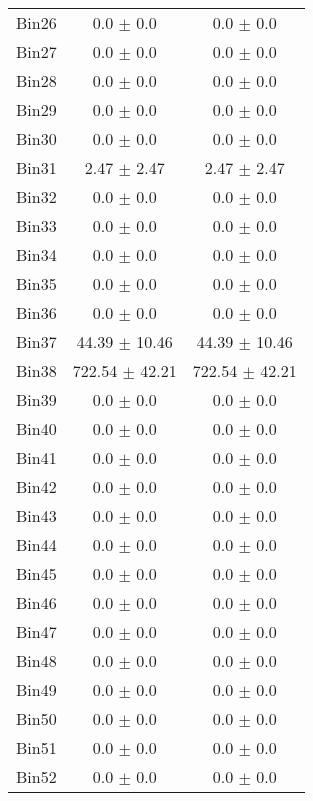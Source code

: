 \begin{tabular}{|c|c|c|}
     Bin26 & 0.0 $\pm$ 0.0 & 0.0 $\pm$ 0.0 \\ \cline{1-3} 
     Bin27 & 0.0 $\pm$ 0.0 & 0.0 $\pm$ 0.0 \\ \cline{1-3} 
     Bin28 & 0.0 $\pm$ 0.0 & 0.0 $\pm$ 0.0 \\ \cline{1-3} 
     Bin29 & 0.0 $\pm$ 0.0 & 0.0 $\pm$ 0.0 \\ \cline{1-3} 
     Bin30 & 0.0 $\pm$ 0.0 & 0.0 $\pm$ 0.0 \\ \cline{1-3} 
     Bin31 & 2.47 $\pm$ 2.47 & 2.47 $\pm$ 2.47 \\ \cline{1-3} 
     Bin32 & 0.0 $\pm$ 0.0 & 0.0 $\pm$ 0.0 \\ \cline{1-3} 
     Bin33 & 0.0 $\pm$ 0.0 & 0.0 $\pm$ 0.0 \\ \cline{1-3} 
     Bin34 & 0.0 $\pm$ 0.0 & 0.0 $\pm$ 0.0 \\ \cline{1-3} 
     Bin35 & 0.0 $\pm$ 0.0 & 0.0 $\pm$ 0.0 \\ \cline{1-3} 
     Bin36 & 0.0 $\pm$ 0.0 & 0.0 $\pm$ 0.0 \\ \cline{1-3} 
     Bin37 & 44.39 $\pm$ 10.46 & 44.39 $\pm$ 10.46 \\ \cline{1-3} 
     Bin38 & 722.54 $\pm$ 42.21 & 722.54 $\pm$ 42.21 \\ \cline{1-3} 
     Bin39 & 0.0 $\pm$ 0.0 & 0.0 $\pm$ 0.0 \\ \cline{1-3} 
     Bin40 & 0.0 $\pm$ 0.0 & 0.0 $\pm$ 0.0 \\ \cline{1-3} 
     Bin41 & 0.0 $\pm$ 0.0 & 0.0 $\pm$ 0.0 \\ \cline{1-3} 
     Bin42 & 0.0 $\pm$ 0.0 & 0.0 $\pm$ 0.0 \\ \cline{1-3} 
     Bin43 & 0.0 $\pm$ 0.0 & 0.0 $\pm$ 0.0 \\ \cline{1-3} 
     Bin44 & 0.0 $\pm$ 0.0 & 0.0 $\pm$ 0.0 \\ \cline{1-3} 
     Bin45 & 0.0 $\pm$ 0.0 & 0.0 $\pm$ 0.0 \\ \cline{1-3} 
     Bin46 & 0.0 $\pm$ 0.0 & 0.0 $\pm$ 0.0 \\ \cline{1-3} 
     Bin47 & 0.0 $\pm$ 0.0 & 0.0 $\pm$ 0.0 \\ \cline{1-3} 
     Bin48 & 0.0 $\pm$ 0.0 & 0.0 $\pm$ 0.0 \\ \cline{1-3} 
     Bin49 & 0.0 $\pm$ 0.0 & 0.0 $\pm$ 0.0 \\ \cline{1-3} 
     Bin50 & 0.0 $\pm$ 0.0 & 0.0 $\pm$ 0.0 \\ \cline{1-3} 
     Bin51 & 0.0 $\pm$ 0.0 & 0.0 $\pm$ 0.0 \\ \cline{1-3} 
     Bin52 & 0.0 $\pm$ 0.0 & 0.0 $\pm$ 0.0 \\ \cline{1-3} 

\end{tabular}
